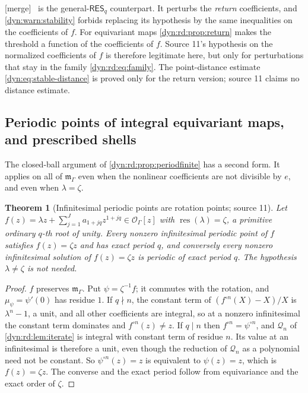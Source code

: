 \documentclass[11pt,letterpaper]{article}
\newtheorem{theorem}{Theorem}[section]
\theoremstyle{definition}
\theoremstyle{remark}
\newcommand{\OO}{\mathcal O}
\newcommand{\m}{\mathfrak m}
\newcommand{\res}{\operatorname{res}}
\newcommand{\resq}{\mathsf{RES}_q}
\newcommand{\mergetag}{\textup{\textsf{\small[merge]}}}%
\numberwithin{equation}{section}
\begin{document}
\mergetag\  is the general-$\resq$ counterpart. It
perturbs the \emph{return} coefficients, and \cref{dyn:warn:stability}
forbids replacing its hypothesis by the same inequalities on the
coefficients of $f$. For equivariant maps \cref{dyn:rd:prop:return} makes
the threshold a function of the coefficients of $f$. Source 11's hypothesis
on the normalized coefficients of $f$ is therefore legitimate here, but only
for perturbations that stay in the family \eqref{dyn:rd:eq:family}. The
point-distance estimate \eqref{dyn:eq:stable-distance} is proved only for
the return version; source 11 claims no distance estimate.

\subsection{Periodic points of integral equivariant maps, and prescribed
shells}\label{dyn:rd:subsec:periods}

The closed-ball argument of \cref{dyn:rd:prop:periodfinite} has a second
form. It applies on all of $\m_\Gamma$ even when the nonlinear coefficients
are not divisible by $e$, and even when $\lambda=\zeta$.

\begin{theorem}[Infinitesimal periodic points are rotation points; source
11]\label{dyn:rd:thm:allperiods}
Let $f(z)=\lambda z+\sum_{j=1}^{J}a_{1+jq}z^{1+jq}\in\OO_\Gamma[z]$ with
$\res(\lambda)=\zeta$, a primitive ordinary $q$-th root of unity. Every
nonzero infinitesimal periodic point of $f$ satisfies $f(z)=\zeta z$ and
has exact period $q$, and conversely every nonzero infinitesimal solution of
$f(z)=\zeta z$ is periodic of exact period $q$. The hypothesis
$\lambda\ne\zeta$ is not needed.
\end{theorem}
\begin{proof}
$f$ preserves $\m_\Gamma$. Put $\psi=\zeta^{-1}f$; it commutes with the
rotation, and $\mu_\psi=\psi'(0)$ has residue $1$. If $q\nmid n$, the
constant term of $(f^{\circ n}(X)-X)/X$ is $\lambda^{n}-1$, a unit, and all
other coefficients are integral, so at a nonzero infinitesimal the constant
term dominates and $f^{\circ n}(z)\ne z$. If $q\mid n$ then
$f^{\circ n}=\psi^{\circ n}$, and $\mathcal Q_n$ of
\cref{dyn:rd:lem:iterate} is integral with constant term of residue $n$. Its
value at an infinitesimal is therefore a unit, even though the reduction of
$\mathcal Q_n$ as a polynomial need not be constant. So
$\psi^{\circ n}(z)=z$ is equivalent to $\psi(z)=z$, which is
$f(z)=\zeta z$. The converse and the exact period follow from equivariance
and the exact order of $\zeta$.
\end{proof}
\end{document}
